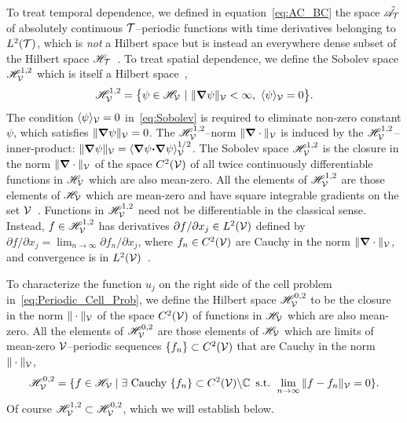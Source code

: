 \documentclass[amsa]{ipart}
\begin{document}
To treat temporal dependence, we defined in equation~\eqref{eq:AC_BC} 
the space $\tilde{\mathscr{A}}_{\mathcal{T}}$ of 
absolutely continuous $\mathcal{T}$--periodic functions with time derivatives
belonging to $L^2(\mathcal{T})$, which is \emph{not} a Hilbert space but is
instead an everywhere dense subset of the Hilbert space
$\mathscr{H}_{\mathcal{T}}$~\cite{Stone:64}. To treat spatial dependence, we define 
the Sobolev space $\mathscr{H}^{1,2}_{\mathcal{V}}$ which is itself a Hilbert
space~\cite{Bhattacharya:AAP:1999:951,Folland:95:PDEs,McOwen:2003:PDE},             
% 
\begin{align}\label{eq:Sobolev}
  \Hs^{1,2}_{\Vc}=\big\{\psi\in \Hs_{\Vc} \ |\  \|\bnabla\psi\|_{\Vc}<\infty, \ \langle\psi\rangle_{\Vc}=0\big\}.
\end{align}
%
The condition $\langle\psi\rangle_{\mathcal{V}}=0$ in~\eqref{eq:Sobolev} is required to
eliminate non-zero constant $\psi$, which satisfies
$\|\mbox{\boldmath${\nabla}$}\psi\|_{\mathcal{V}}=0$. The $\mathscr{H}^{1,2}_{\mathcal{V}}$--norm $\|\mbox{\boldmath${\nabla}$}\cdot\|_{\mathcal{V}}$
is induced by the $\mathscr{H}^{1,2}_{\mathcal{V}}$--inner-product:
$\|\mbox{\boldmath${\nabla}$}\psi\|_{\mathcal{V}}=\langle\mbox{\boldmath${\nabla}$}\psi\mbox{\boldmath${\cdot}$}\mbox{\boldmath${\nabla}$}\psi\rangle_{\mathcal{V}}^{1/2}$. The Sobolev
space $\mathscr{H}^{1,2}_{\mathcal{V}}$ is the closure in the norm $\|\mbox{\boldmath${\nabla}$}\cdot\|_{\mathcal{V}}$
of the space $C^2(\mathcal{V})$ of all twice continuously differentiable
functions in $\mathscr{H}_{\mathcal{V}}$ which are also mean-zero. All the elements of
$\mathscr{H}^{1,2}_{\mathcal{V}}$ are those elements of $\mathscr{H}_{\mathcal{V}}$ which are
mean-zero and have square integrable gradients on the set 
$\mathcal{V}$~\cite{Bhattacharya:AAP:1999:951}. Functions in $\mathscr{H}^{1,2}_{\mathcal{V}}$
need not be differentiable in the classical 
sense. Instead, $f\in\mathscr{H}^{1,2}_{\mathcal{V}}$ has derivatives $\partial f/\partial x_j\in
L^2(\mathcal{V})$ defined by $\partial f/\partial x_j=\lim_{n\to\infty}\partial f_n/\partial x_j$, where $f_n\in
C^2(\mathcal{V})$ are Cauchy in the norm $\|\mbox{\boldmath${\nabla}$}\cdot\|_{\mathcal{V}}$, and convergence is
in $L^2(\mathcal{V})$~\cite{McOwen:2003:PDE}.


To characterize the function $u_j$ on the right
side of the cell problem in~\eqref{eq:Periodic_Cell_Prob}, we define
the Hilbert space $\mathscr{H}^{0,2}_{\mathcal{V}}$ to be the closure in the norm
$\|\cdot\|_{\mathcal{V}}$ of the space $C^2(\mathcal{V})$ of functions in $\mathscr{H}_{\mathcal{V}}$ which
are also mean-zero. All the elements of
$\mathscr{H}^{0,2}_{\mathcal{V}}$ are those elements of $\mathscr{H}_{\mathcal{V}}$ which are limits of
mean-zero $\mathcal{V}$--periodic sequences $\{f_n\}\subset C^2(\mathcal{V})$ that are Cauchy   
in the norm $\|\cdot\|_{\mathcal{V}}$,
%
\begin{align}
  \Hs^{0,2}_{\Vc}=\{f\in\Hs_{\Vc} \;|\; \exists \text{ Cauchy }
  \{f_n\}\subset C^2(\Vc)\backslash\mathbb{C} \,\text{ s.t. } \lim_{n\to\infty}\|f-f_n\|_{\Vc}=0\}.   
\end{align}
%
Of course $\mathscr{H}^{1,2}_{\mathcal{V}}\subset\mathscr{H}^{0,2}_{\mathcal{V}}$, which we will establish
below.
\end{document}
